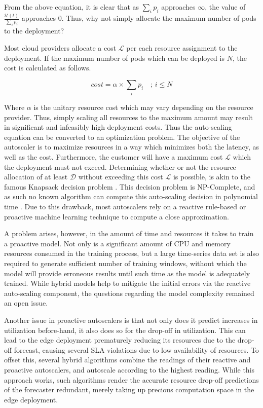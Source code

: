 From the above equation, it is clear that as $\sum_{i} p_{i}$ approaches $\infty$, the value of $\frac{\mathcal{U}(t)}{\sum_{i} p_{i}}$ approaches 0. Thus, why not simply allocate the maximum number of pods to the deployment?\par

Most cloud providers allocate a cost $\mathcal{L}$ per each resource assignment to the deployment. If the maximum number of pods which can be deployed is $N$, the cost is calculated as follows.

\begin{equation}
    cost = \alpha \times \sum_{i} p_{i} \quad ;\,i \le N
\end{equation}

Where $\alpha$ is the unitary resource cost which may vary depending on the resource provider. Thus, simply scaling all resources to the maximum amount may result in significant and infeasibly high deployment costs. Thus the auto-scaling equation can be converted to an optimization problem. The objective of the autoscaler is to maximize resources in a way which minimizes both the latency, as well as the cost. Furthermore, the customer will have a maximum cost $\mathcal{L}$ which the deployment must not exceed. Determining whether or not the resource allocation of at least $\mathcal{D}$ without exceeding this cost $\mathcal{L}$ is possible, is akin to the famous Knapsack decision problem \cite{kellerer2004introduction}. This decision problem is NP-Complete, and as such no known algorithm can compute this auto-scaling decision in polynomial time \cite{martello1987algorithms}. Due to this drawback, most autoscalers rely on a reactive rule-based or proactive machine learning technique to compute a close approximation.\par

A problem arises, however, in the amount of time and resources it takes to train a proactive model. Not only is a significant amount of CPU and memory resources consumed in the training process, but a large time-series data set is also required to generate sufficient number of training windows, without which the model will provide erroneous results until such time as the model is adequately trained. While hybrid models help to mitigate the initial errors via the reactive auto-scaling component, the questions regarding the model complexity remained an open issue.\par

Another issue in proactive autoscalers is that not only does it predict increases in utilization before-hand, it also does so for the drop-off in utilization. This can lead to the edge deployment prematurely reducing its resources due to the drop-off forecast, causing several SLA violations due to low availability of resources. To offset this, several hybrid algorithms combine the readings of their reactive and proactive autoscalers, and autoscale according to the highest reading. While this approach works, such algorithms render the accurate resource drop-off predictions of the forecaster redundant, merely taking up precious computation space in the edge deployment.\par

